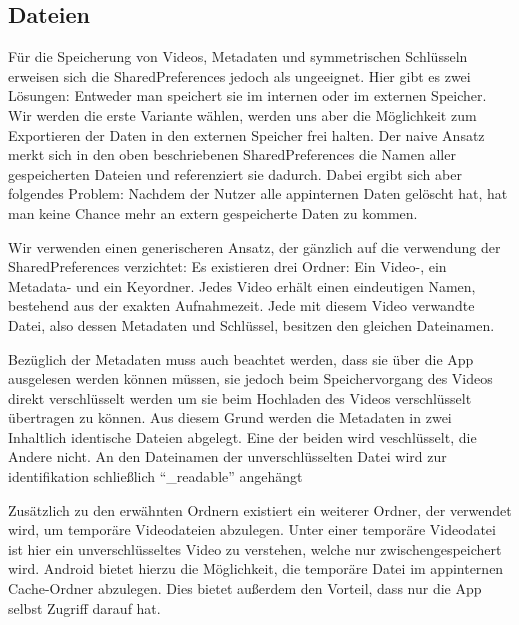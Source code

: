 \subsection{Dateien}
Für die Speicherung von Videos, Metadaten und symmetrischen Schlüsseln erweisen sich die SharedPreferences jedoch als ungeeignet. Hier gibt es zwei Lösungen: Entweder man speichert sie im internen oder im externen Speicher. Wir werden die erste Variante wählen, werden uns aber die Möglichkeit zum Exportieren der Daten in den externen Speicher frei halten. Der naive Ansatz merkt sich in den oben beschriebenen SharedPreferences die Namen aller gespeicherten Dateien und referenziert sie dadurch. Dabei ergibt sich aber folgendes Problem: Nachdem der Nutzer alle appinternen Daten gelöscht hat, hat man keine Chance mehr an extern gespeicherte Daten zu kommen. \newline\par
Wir verwenden einen generischeren Ansatz, der gänzlich auf die verwendung der SharedPreferences verzichtet: Es existieren drei Ordner: Ein Video-, ein Metadata- und ein Keyordner. Jedes Video erhält einen eindeutigen Namen, bestehend aus der exakten Aufnahmezeit. Jede mit diesem Video verwandte Datei, also dessen Metadaten und Schlüssel, besitzen den gleichen Dateinamen.\newline\par

Bezüglich der Metadaten muss auch beachtet werden, dass sie über die App ausgelesen werden können müssen, sie jedoch beim Speichervorgang des Videos direkt verschlüsselt werden um sie beim Hochladen des Videos verschlüsselt übertragen zu können. Aus diesem Grund werden die Metadaten in zwei Inhaltlich identische Dateien abgelegt. Eine der beiden wird veschlüsselt, die Andere nicht. An den Dateinamen der unverschlüsselten Datei wird zur identifikation schließlich ``\_readable'' angehängt\newline\par

Zusätzlich zu den erwähnten Ordnern existiert ein weiterer Ordner, der verwendet wird, um temporäre Videodateien abzulegen. Unter einer temporäre Videodatei ist hier ein unverschlüsseltes Video zu verstehen, welche nur zwischengespeichert wird. Android bietet hierzu die Möglichkeit, die temporäre Datei im appinternen Cache-Ordner abzulegen. Dies bietet außerdem den Vorteil, dass nur die App selbst Zugriff darauf hat.


